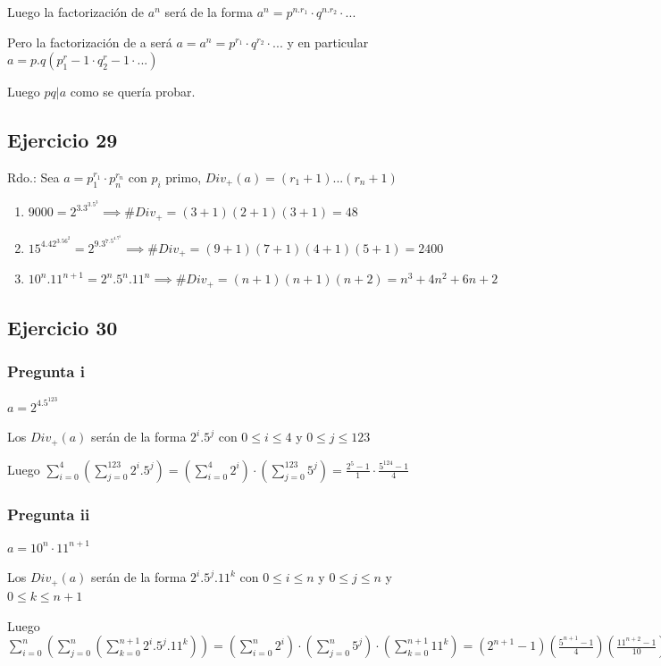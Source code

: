 Luego la factorización de $ a^n $ será de la forma $ a^n = p^{n.r_1} \cdot q^{n.r_2} \cdot ... $

Pero la factorización de a será $ a = a^n = p^{r_1} \cdot q^{r_2} \cdot ... $ y en particular $ a = p.q(p^r_1-1 \cdot q^r_2-1 \cdot ...) $

Luego $ pq|a $ como se quería probar.

\subsection{Ejercicio 29}
Rdo.: Sea $ a = p_1^{r_1} \cdot p_n^{r_n}$ con $p_i$ primo, $ Div_+(a) = (r_1 + 1)...(r_n + 1) $

\begin{enumerate}
    \item $ 9000 = 2^3.3^3.5^3 \implies \#Div_+ = (3+1)(2+1)(3+1) = 48$
    \item $ 15^4.42^3.56^2 = 2^9.3^7.5^4.7^5 \implies \#Div_+ = (9+1)(7+1)(4+1)(5+1) = 2400 $ 
    \item $ 10^n.11^{n+1} = 2^n.5^n.11^n \implies \#Div_+ = (n+1)(n+1)(n+2) = n^3 + 4n^2+6n+2$ 
\end{enumerate}

\subsection{Ejercicio 30}
\subsubsection{Pregunta i}

$ a = 2^4.5^123 $

Los $ Div_+(a) $ serán de la forma $ 2^i . 5^j $ con $ 0\leq i \leq 4 $ y $ 0\leq j \leq 123 $

Luego $ \sum_{i=0}^{4}\left( \sum_{j=0}^{123}2^i.5^j \right) = \left( \sum_{i=0}^{4}2^i \right) \cdot \left( \sum_{j=0}^{123}5^j \right) = \frac{2^5 - 1}{1} \cdot \frac{5^124 - 1}{4} $

\subsubsection{Pregunta ii}
$ a = 10^n \cdot 11^{n+1} $

Los $ Div_+(a) $ serán de la forma $ 2^i . 5^j . 11^k $ con $ 0\leq i \leq n $ y $ 0\leq j \leq n $ y $ 0\leq k \leq n+1 $

Luego $ \sum_{i=0}^{n}\left( \sum_{j=0}^{n} \left( \sum_{k=0}^{n+1} 2^i.5^j.11^k \right) \right) = \left( \sum_{i=0}^{n}2^i \right) \cdot \left( \sum_{j=0}^{n}5^j \right) \cdot \left( \sum_{k=0}^{n+1}11^k \right) = (2^{n+1} - 1)(\frac{5^{n+1}-1}{4})(\frac{11^{n+2}-1}{10})$

